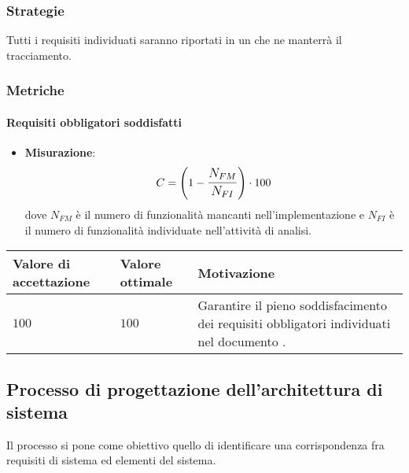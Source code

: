 \subsubsection{Strategie}
Tutti i requisiti individuati saranno riportati in un  che ne manterrà il tracciamento.

\subsubsection{Metriche}
\paragraph{Requisiti obbligatori soddisfatti}

\begin{itemize}
\item \textbf{Misurazione}: 
		$$C=\left(1-\mathlarger{\frac{N_{FM}}{N_{FI}}}\right) \cdot 100$$ 
	dove $N_{FM}$ è il numero di funzionalità mancanti nell'implementazione e $N_{FI}$ è il numero di funzionalità individuate nell'attività di analisi. 
\end{itemize}
	
\begin{center}
	\begin{tabular}{|P{2.5cm}|P{2.5cm}|P{6cm}|}
		\hline
			\textbf{Valore di accettazione}	& \textbf{Valore ottimale} & \textbf{Motivazione} \\
			\hline
			$100$ & $100$ & Garantire il pieno soddisfacimento dei requisiti obbligatori individuati nel documento \AdR. \\
			\hline
			\end{tabular}
\end{center}	

\subsection{Processo di progettazione dell'architettura di sistema}

Il processo si pone come obiettivo quello di identificare una corrispondenza fra requisiti di sistema ed elementi del sistema.
